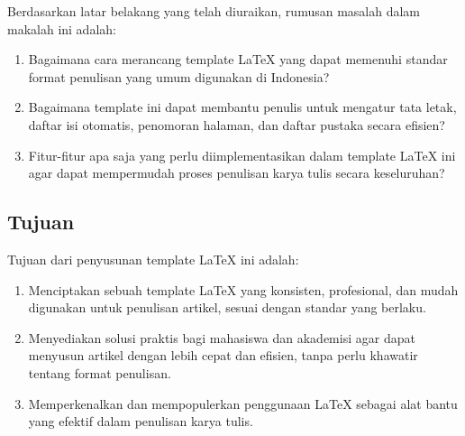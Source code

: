 Berdasarkan latar belakang yang telah diuraikan, rumusan masalah dalam makalah ini adalah:

\begin{enumerate}
    \item Bagaimana cara merancang template LaTeX yang dapat memenuhi standar format penulisan yang umum digunakan di Indonesia?
    \item Bagaimana template ini dapat membantu penulis untuk mengatur tata letak, daftar isi otomatis, penomoran halaman, dan daftar pustaka secara efisien?
    \item Fitur-fitur apa saja yang perlu diimplementasikan dalam template LaTeX ini agar dapat mempermudah proses penulisan karya tulis secara keseluruhan?
\end{enumerate}

\subsection{Tujuan}

Tujuan dari penyusunan template LaTeX ini adalah:

\begin{enumerate}
    \item Menciptakan sebuah template LaTeX yang konsisten, profesional, dan mudah digunakan untuk penulisan artikel, sesuai dengan standar yang berlaku.
    \item Menyediakan solusi praktis bagi mahasiswa dan akademisi agar dapat menyusun artikel dengan lebih cepat dan efisien, tanpa perlu khawatir tentang format penulisan.
    \item Memperkenalkan dan mempopulerkan penggunaan LaTeX sebagai alat bantu yang efektif dalam penulisan karya tulis.
\end{enumerate}